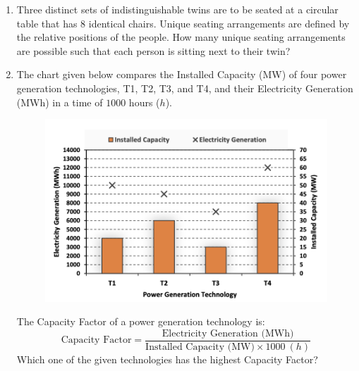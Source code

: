 \documentclass[journal]{IEEEtran}
\begin{document}
\begin{enumerate}
\item Three distinct sets of indistinguishable twins are to be seated at a circular table that has $8$ identical chairs. Unique seating arrangements are defined by the relative positions of the people.  
How many unique seating arrangements are possible such that each person is sitting next to their twin?  
\hfill {}  
\begin{enumerate}
\end{enumerate}

\item The chart given below compares the Installed Capacity (MW) of four power generation technologies, T1, T2, T3, and T4, and their Electricity Generation (MWh) in a time of $1000$ hours ($h$).  
\begin{figure}[H]
    \centering
    \includegraphics[width=0.6\columnwidth]{figs/Q8.png} 
    \caption{}
    \label{fig:placeholder}
\end{figure}
The Capacity Factor of a power generation technology is:  
$$\text{Capacity Factor} = \frac{\text{Electricity Generation (MWh)}}{\text{Installed Capacity (MW)} \times 1000 \ (h)}$$  
Which one of the given technologies has the highest Capacity Factor?  
\hfill {}  
\begin{enumerate}
\end{enumerate}


\end{enumerate}
\end{document}
